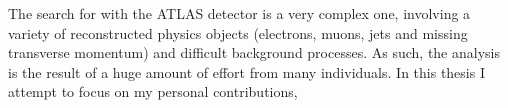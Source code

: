 
The search for \HWWlvlv with the ATLAS detector is a very complex one, involving a variety 
of reconstructed physics objects (electrons, muons, jets and missing transverse momentum)
and difficult background processes. As such, the analysis is the result of a huge amount of
effort from many individuals. In this thesis I attempt to focus on my personal contributions,
